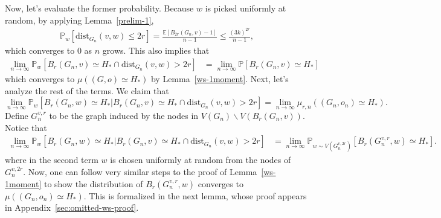 \documentclass[10pt]{amsart}
\begin{document}
Now, let's evaluate the former probability. Because $w$ is picked uniformly at random, by applying Lemma~\ref{prelim-1}, 
\begin{align*} 
\mathbb{P}_w[\text{dist}_{G_n}(v, w) \leq 2r] = \frac{\mathbb{E}[B_{2r}(G_n, v)-1]}{n-1} \leq \frac{(3k)^{2r}}{n-1},
\end{align*}
which converges to $0$ as $n$ grows. This also implies that 
\begin{align*}
    \lim_{n \to \infty} \mathbb{P}_w[B_r(G_n, v) \simeq H_* \cap \text{dist}_{G_n}(v, w) > 2r] &=  \lim_{n \to \infty} \mathbb{P}[B_r(G_n, v) \simeq H_* ]
\end{align*}
which converges to $\mu((G,o)\simeq H_*)$ by Lemma~\ref{ws-1moment}. Next, let's analyze the rest of the terms. We claim  that $$\lim_{n \to \infty} \mathbb{P}_w[ B_r(G_n, w) \simeq H_* | B_r(G_n, v) \simeq H_* \cap \text{dist}_{G_n}(v, w) > 2r] = \lim_{n \to \infty} \mu_{r, n}((G_n,o_n)\simeq H_*).$$
Define $G_n^{v,r}$ to be the graph induced by the nodes in $V(G_n) \backslash V(B_{r}(G_n, v))$. Notice that 
\begin{align*}
    \lim_{n \to \infty} \mathbb{P}_w[ B_r(G_n, w) \simeq H_* | B_r(G_n, v) \simeq H_* \cap \text{dist}_{G_n}(v, w) > 2r] &=  \lim_{n \to \infty} \mathbb{P}_{w\sim V(G_n^{v,2r} )}[ B_r(G_n^{v,r}, w) \simeq H_*].
\end{align*}
where in the second term $w$ is chosen uniformly at random from the nodes of $G_n^{v,2r}$. Now, one can follow very similar steps to the proof of Lemma~\ref{ws-1moment} to show the distribution of $B_r(G_n^{v,r}, w)$ converges to $\mu((G_n,o_n)\simeq H_*)$. This is formalized in the next lemma, whose proof appears in Appendix~\ref{sec:omitted-ws-proof}.
\end{document}
